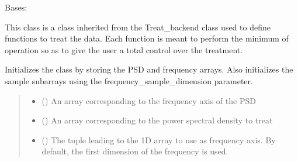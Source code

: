 \documentclass[letterpaper,10pt,english]{sphinxmanual}
\begin{document}
\begin{fulllineitems}
\label{\detokenize{source/_autosummary/HDF5_BLS_treat.Treat:HDF5_BLS_treat.Treat}}
\pysigstartsignatures
\pysiglinewithargsret
{}
{\sphinxparamcomma {}}
{}
\pysigstopsignatures
\sphinxAtStartPar
Bases: {\hyperref[\detokenize{source/_autosummary/HDF5_BLS_treat.Treat_backend:HDF5_BLS_treat.Treat_backend}]{}}

\sphinxAtStartPar
This class is a class inherited from the Treat\_backend class used to define functions to treat the data. Each function is meant to perform the minimum of operation so as to give the user a total control over the treatment.

\begin{fulllineitems}
\label{\detokenize{source/_autosummary/HDF5_BLS_treat.Treat:HDF5_BLS_treat.Treat.__init__}}
\pysigstartsignatures
\pysiglinewithargsret
{}
{\sphinxparamcomma {}}
{}
\pysigstopsignatures
\sphinxAtStartPar
Initializes the class by storing the PSD and frequency arrays. Also initializes the sample sub\sphinxhyphen{}arrays using the frequency\_sample\_dimension parameter.
\begin{quote}\begin{description}
\begin{itemize}
\item {} 
\sphinxAtStartPar
{} () \textendash{} An array corresponding to the frequency axis of the PSD

\item {} 
\sphinxAtStartPar
{} () \textendash{} An array corresponding to the power spectral density to treat

\item {} 
\sphinxAtStartPar
{} (\sphinxstyleliteralemphasis{\sphinxupquote{, }}) \textendash{} The tuple leading to the 1\sphinxhyphen{}D array to use as frequency axis. By default, the first dimension of the frequency is used.


\end{itemize}
\end{description}
\end{quote}
\end{fulllineitems}
\end{fulllineitems}
\end{document}
